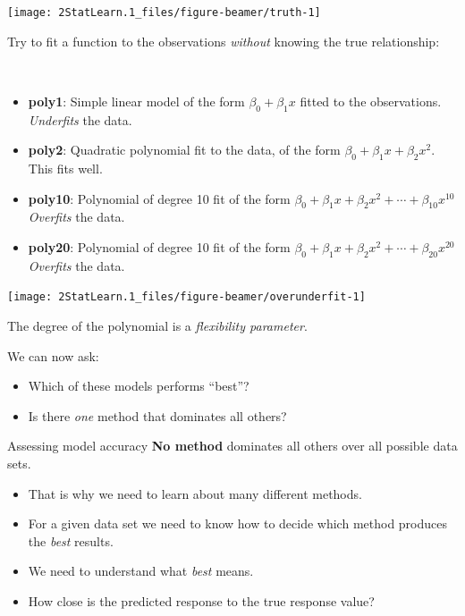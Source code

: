 \documentclass[
  ignorenonframetext,
]{beamer}
\providecommand{\tightlist}{%
  \setlength{\itemsep}{0pt}\setlength{\parskip}{0pt}}
\begin{document}
\begin{frame}
\begin{center}\texttt{[image: 2StatLearn.1\_files/figure-beamer/truth-1]} \end{center}
\end{frame}

\begin{frame}
Try to fit a function to the observations \emph{without} knowing the
true relationship:

\(~\)

\begin{itemize}
\item
  \textbf{poly1}: Simple linear model of the form \(\beta_0+\beta_1 x\)
  fitted to the observations. \emph{Underfits} the data.
\item
  \textbf{poly2}: Quadratic polynomial fit to the data, of the form
  \(\beta_0+\beta_1 x +\beta_2 x^2\). This fits well.
\item
  \textbf{poly10}: Polynomial of degree 10 fit of the form
  \(\beta_0+\beta_1 x +\beta_2 x^2+\cdots +\beta_{10}x^{10}\)
  \emph{Overfits} the data.
\item
  \textbf{poly20}: Polynomial of degree 10 fit of the form
  \(\beta_0+\beta_1 x +\beta_2 x^2+\cdots +\beta_{20}x^{20}\)
  \emph{Overfits} the data.
\end{itemize}
\end{frame}

\begin{frame}
\begin{center}\texttt{[image: 2StatLearn.1\_files/figure-beamer/overunderfit-1]} \end{center}

The degree of the polynomial is a \emph{flexibility parameter}.
\end{frame}

\begin{frame}
We can now ask:

\begin{itemize}
\item
  Which of these models performs ``best''?
\item
  Is there \emph{one} method that dominates all others?
\end{itemize}
\end{frame}

\begin{frame}{Assessing model accuracy}
\protect\hypertarget{assessing-model-accuracy}{}
\textbf{No method} dominates all others over all possible data sets.

\begin{itemize}
\tightlist
\item
  That is why we need to learn about many different methods.
\item
  For a given data set we need to know how to decide which method
  produces the \emph{best} results.
\item
  We need to understand what \emph{best} means.
\item
  How close is the predicted response to the true response value?
\end{itemize}
\end{frame}
\end{document}
